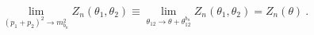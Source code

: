 \begin{equation}
\lim_{(p_{1}+p_{2})^{2}\rightarrow m_{b_{n}}^{2}}Z_{n}(\theta _{1},\theta
_{2})\equiv \lim_{\theta _{12}\rightarrow \theta +\theta
_{12}^{b_{n}}}Z_{n}(\theta _{1},\theta _{2})=Z_{n}(\theta )~.
\label{onshell}
\end{equation}%
